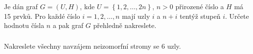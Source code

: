 \subsubsection{}
Je dán graf $G=(U,H)$, kde $U=\left \{ 1,2, \dots,2n \right \}$, $n>0$ přirozené
číslo a $H$ má 15 prvků. Pro každé číslo $i=1,2, \dots,n$ mají uzly $i$ a $n+i$
tentýž stupeň $i$. Určete hodnotu čísla $n$ a pak graf $G$ přehledně nakreslete.
\subsubsection{}
Nakreslete všechny navzájem neizomorfní stromy se 6 uzly.
